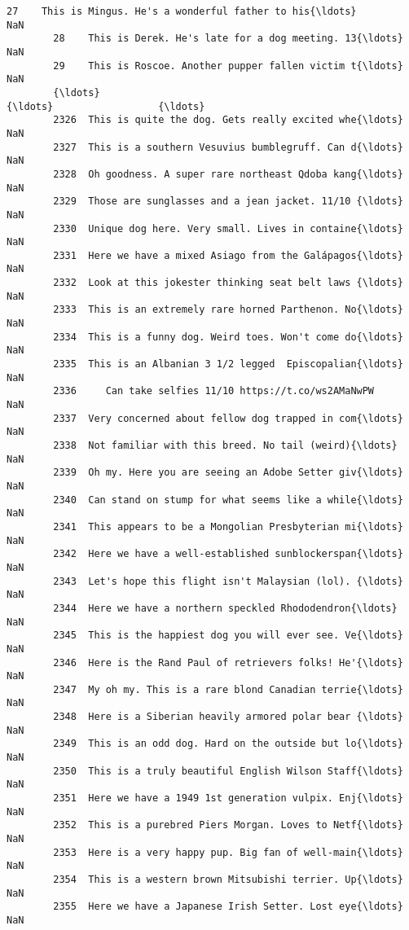 \documentclass[11pt]{article}
\begin{document}
\begin{Verbatim}[commandchars=\\\{\}]
        27    This is Mingus. He's a wonderful father to his{\ldots}                  NaN   
        28    This is Derek. He's late for a dog meeting. 13{\ldots}                  NaN   
        29    This is Roscoe. Another pupper fallen victim t{\ldots}                  NaN   
        {\ldots}                                                 {\ldots}                  {\ldots}   
        2326  This is quite the dog. Gets really excited whe{\ldots}                  NaN   
        2327  This is a southern Vesuvius bumblegruff. Can d{\ldots}                  NaN   
        2328  Oh goodness. A super rare northeast Qdoba kang{\ldots}                  NaN   
        2329  Those are sunglasses and a jean jacket. 11/10 {\ldots}                  NaN   
        2330  Unique dog here. Very small. Lives in containe{\ldots}                  NaN   
        2331  Here we have a mixed Asiago from the Galápagos{\ldots}                  NaN   
        2332  Look at this jokester thinking seat belt laws {\ldots}                  NaN   
        2333  This is an extremely rare horned Parthenon. No{\ldots}                  NaN   
        2334  This is a funny dog. Weird toes. Won't come do{\ldots}                  NaN   
        2335  This is an Albanian 3 1/2 legged  Episcopalian{\ldots}                  NaN   
        2336     Can take selfies 11/10 https://t.co/ws2AMaNwPW                  NaN   
        2337  Very concerned about fellow dog trapped in com{\ldots}                  NaN   
        2338  Not familiar with this breed. No tail (weird){\ldots}                  NaN   
        2339  Oh my. Here you are seeing an Adobe Setter giv{\ldots}                  NaN   
        2340  Can stand on stump for what seems like a while{\ldots}                  NaN   
        2341  This appears to be a Mongolian Presbyterian mi{\ldots}                  NaN   
        2342  Here we have a well-established sunblockerspan{\ldots}                  NaN   
        2343  Let's hope this flight isn't Malaysian (lol). {\ldots}                  NaN   
        2344  Here we have a northern speckled Rhododendron{\ldots}                  NaN   
        2345  This is the happiest dog you will ever see. Ve{\ldots}                  NaN   
        2346  Here is the Rand Paul of retrievers folks! He'{\ldots}                  NaN   
        2347  My oh my. This is a rare blond Canadian terrie{\ldots}                  NaN   
        2348  Here is a Siberian heavily armored polar bear {\ldots}                  NaN   
        2349  This is an odd dog. Hard on the outside but lo{\ldots}                  NaN   
        2350  This is a truly beautiful English Wilson Staff{\ldots}                  NaN   
        2351  Here we have a 1949 1st generation vulpix. Enj{\ldots}                  NaN   
        2352  This is a purebred Piers Morgan. Loves to Netf{\ldots}                  NaN   
        2353  Here is a very happy pup. Big fan of well-main{\ldots}                  NaN   
        2354  This is a western brown Mitsubishi terrier. Up{\ldots}                  NaN   
        2355  Here we have a Japanese Irish Setter. Lost eye{\ldots}                  NaN   
        

\end{Verbatim}
\end{document}
